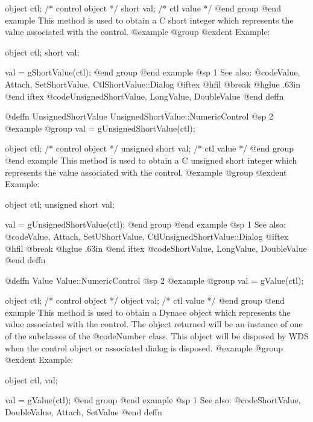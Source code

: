 object  ctl;   /*  control object  */
short   val;   /*  ctl value       */
@end group
@end example
This method is used to obtain a C short integer which represents the
value associated with the control.  
@example
@group
@exdent Example:

object  ctl;
short   val;

val = gShortValue(ctl);
@end group
@end example
@sp 1
See also:  @code{Value, Attach, SetShortValue, CtlShortValue::Dialog}
@iftex
@hfil @break @hglue .63in 
@end iftex
@code{UnsignedShortValue, LongValue, DoubleValue}
@end deffn











@deffn {UnsignedShortValue} UnsignedShortValue::NumericControl
@sp 2
@example
@group
val = gUnsignedShortValue(ctl);

object  ctl;           /*  control object  */
unsigned short  val;   /*  ctl value       */
@end group
@end example
This method is used to obtain a C unsigned short integer which represents the
value associated with the control.  
@example
@group
@exdent Example:

object  ctl;
unsigned short  val;

val = gUnsignedShortValue(ctl);
@end group
@end example
@sp 1
See also:  @code{Value, Attach, SetUShortValue, CtlUnsignedShortValue::Dialog}
@iftex
@hfil @break @hglue .63in 
@end iftex
@code{ShortValue, LongValue, DoubleValue}
@end deffn










@deffn {Value} Value::NumericControl
@sp 2
@example
@group
val = gValue(ctl);

object  ctl;   /*  control object  */
object  val;   /*  ctl value       */
@end group
@end example
This method is used to obtain a Dynace object which represents the value
associated with the control.  The object returned will be an instance of
one of the subclasses of the @code{Number} class.  This object will be
disposed by WDS when the control object or associated dialog is
disposed.
@example
@group
@exdent Example:

object  ctl, val;

val = gValue(ctl);
@end group
@end example
@sp 1
See also:  @code{ShortValue, DoubleValue, Attach, SetValue}
@end deffn









